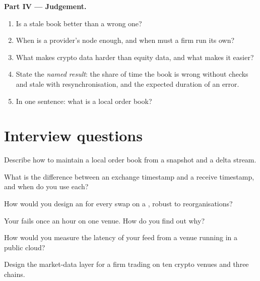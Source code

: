 \begin{problem}
\medskip\noindent\textbf{Part IV --- Judgement.}
\begin{enumerate}[resume]
\item Is a stale book better than a wrong one?
\item When is a provider's node enough, and when must a firm run its own?
\item What makes crypto data harder than equity data, and what makes it easier?
\item State the \emph{named result}: the share of time the book is wrong without checks and stale with resynchronisation, and the expected duration of an error.
\item In one sentence: what is a local order book?
\end{enumerate}
\end{problem}

\section{Interview questions}

\begin{interviewq}\label{iq:m3:crypto-data-and-infrastructure:1}
Describe how to maintain a local order book from a snapshot and a delta stream.
\end{interviewq}

\begin{interviewq}\label{iq:m3:crypto-data-and-infrastructure:2}
What is the difference between an exchange timestamp and a receive timestamp, and when do you use each?
\end{interviewq}

\begin{interviewq}\label{iq:m3:crypto-data-and-infrastructure:3}
How would you design an  for every swap on a , robust to reorganisations?
\end{interviewq}

\begin{interviewq}\label{iq:m3:crypto-data-and-infrastructure:4}
Your  fails once an hour on one venue. How do you find out why?
\end{interviewq}

\begin{interviewq}\label{iq:m3:crypto-data-and-infrastructure:5}
How would you measure the latency of your feed from a venue running in a public cloud?
\end{interviewq}

\begin{interviewq}\label{iq:m3:crypto-data-and-infrastructure:6}
Design the market-data layer for a firm trading on ten crypto venues and three chains.
\end{interviewq}
